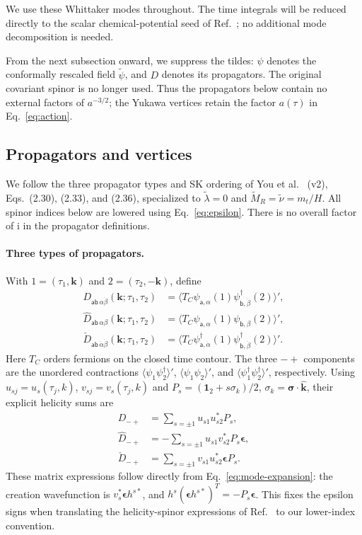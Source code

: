 \documentclass[a4paper,12pt]{article}
\newcommand{\ii}{\mathrm i}
\newcommand{\mb}{\mathbf}
\def\aa{\mathsf a}
\newcommand{\bb}{\mathsf b}
\newcommand{\bk}{\mb k}
\newcommand{\bs}{\bm\sigma}
\newcommand{\one}{\mathbf1_2}
\newcommand{\epsmat}{\boldsymbol{\epsilon}}
\begin{document}
We use these Whittaker modes throughout. The time integrals will be
reduced directly to the scalar chemical-potential seed of
Ref.~\cite{qin-seed}; no additional mode decomposition is needed.

From the next subsection onward, we suppress the tildes: $\psi$
denotes the conformally rescaled field $\widetilde\psi$, and $D$ denotes
its propagators. The original covariant spinor is no longer used.
Thus the propagators below contain no external factors of $a^{-3/2}$;
the Yukawa vertices retain the factor $a(\tau)$ in Eq.~\eqref{eq:action}.

\subsection{Propagators and vertices}
\label{sec:propagators}
We follow the three propagator types and SK ordering of
You et al.~\cite{you} (v2), Eqs.~(2.30), (2.33), and (2.36),
specialized to $\widetilde\lambda=0$ and
$\widetilde M_R=\widetilde\nu=m_t/H$. 
All spinor indices below are lowered using
Eq.~\eqref{eq:epsilon}.
There is no overall factor of $\ii$ in the propagator definitions.

\paragraph{Three types of propagators.}
With $1=(\tau_1,\bk)$ and $2=(\tau_2,-\bk)$, define
\begin{align}
 D_{\aa\bb\,\alpha\dot\beta}(\bk;\tau_1,\tau_2)
 &=\langle T_C\psi_{\aa,\alpha}(1)\psi^\dagger_{\bb,\dot\beta}(2)\rangle',
 \nonumber\\
 \widehat D_{\aa\bb\,\alpha\beta}(\bk;\tau_1,\tau_2)
 &=\langle T_C\psi_{\aa,\alpha}(1)\psi_{\bb,\beta}(2)\rangle',
 \nonumber\\
 \check D_{\aa\bb\,\dot\alpha\dot\beta}(\bk;\tau_1,\tau_2)
 &=\langle T_C\psi^\dagger_{\aa,\dot\alpha}(1)
                    \psi^\dagger_{\bb,\dot\beta}(2)\rangle'.
 \label{eq:aoki-indexed-propagators}
\end{align}
Here $T_C$ orders fermions on the closed time contour. The three
$-+$ components are the unordered contractions
$\langle\psi_1\psi_2^\dagger\rangle'$,
$\langle\psi_1\psi_2\rangle'$, and
$\langle\psi_1^\dagger\psi_2^\dagger\rangle'$, respectively.
Using $u_{sj}=u_s(\tau_j,k)$, $v_{sj}=v_s(\tau_j,k)$ and
$P_s=(\one+s\sigma_k)/2$, $\sigma_k=\bs\cdot\widehat{\bk}$, their
explicit helicity sums are
\begin{align}
 D_{-+}
 &=\sum_{s=\pm1}u_{s1}u_{s2}^*P_s,
 \nonumber\\
 \widehat D_{-+}
 &=-\sum_{s=\pm1}u_{s1}v_{s2}^*P_s\epsmat,
 \nonumber\\
 \check D_{-+}
 &=\sum_{s=\pm1}v_{s1}u_{s2}^*\epsmat P_s.
 \label{eq:propagator-mode-sums}
\end{align}
These matrix expressions follow directly from
Eq.~\eqref{eq:mode-expansion}: the creation wavefunction is
$v_s^*\epsmat h^{s*}$, and
$h^s(\epsmat h^{s*})^T=-P_s\epsmat$.
This fixes the epsilon signs when translating the helicity-spinor
expressions of Ref.~\cite{you} to our lower-index convention.
\end{document}
